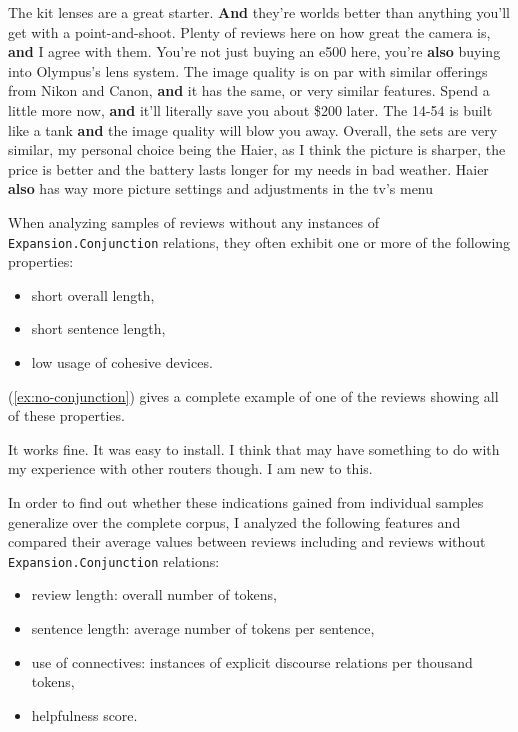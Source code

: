 \documentclass[
    a4paper,%
    12pt,%
    oneside,%
    toc=bibliography,
    final,
]{scrartcl}
\begin{document}
\begin{exe}
\ex \label{ex:conjunction-first} The kit lenses are a great starter. \textbf{And} they're worlds better than anything you'll get with a point-and-shoot.
\ex Plenty of reviews here on how great the camera is, \textbf{and} I agree with them.
\ex You're not just buying an e500 here, you're \textbf{also} buying into Olympus's lens system.
\ex The image quality is on par with similar offerings from Nikon and Canon, \textbf{and} it has the same, or very similar features.
\ex Spend a little more now, \textbf{and} it'll literally save you about \$200 later.
\ex The 14-54 is built like a tank \textbf{and} the image quality will blow you away.
\ex \label{ex:conjunction-last} Overall, the sets are very similar, my personal choice being the Haier, as I think the picture is sharper, the price is better and the battery lasts longer for my needs in bad weather. Haier \textbf{also} has way more picture settings and adjustments in the tv's menu
\end{exe}

When analyzing samples of reviews without any instances of \lstinline|Expansion.Conjunction| relations, they often exhibit one or more of the following properties:

\begin{itemize}
\item short overall length,
\item short sentence length,
\item low usage of cohesive devices.
\end{itemize}

(\ref{ex:no-conjunction}) gives a complete example of one of the reviews showing all of these properties.

\begin{exe}
\ex \label{ex:no-conjunction} It works fine.  It was easy to install.  I think that may have something to do with my experience with other routers though.  I am new to this.
\end{exe}

In order to find out whether these indications gained from individual samples generalize over the complete corpus, I analyzed the following features and compared their average values between reviews including and reviews without \lstinline|Expansion.Conjunction| relations:

\begin{itemize}
\item review length: overall number of tokens,
\item sentence length: average number of tokens per sentence,
\item use of connectives: instances of explicit discourse relations per thousand tokens,
\item helpfulness score.
\end{itemize}
\end{document}
